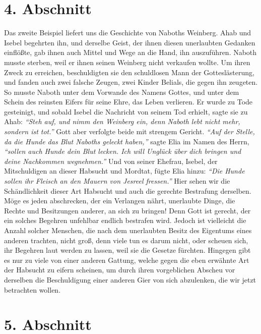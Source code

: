 \section{4. Abschnitt} \label{kap13_ab4}

Das zweite Beispiel liefert uns die Geschichte von
Naboths Weinberg.
Ahab und Isebel begehrten ihn, und
derselbe Geist, der ihnen diesen unerlaubten
Gedanken einflößte, gab ihnen auch Mittel und Wege an die Hand, ihn auszuführen.
Naboth musste sterben, weil er ihnen seinen Weinberg nicht verkaufen wollte. Um
ihren Zweck zu erreichen, beschuldigten sie den schuldlosen Mann der
Gotteslästerung, und fanden auch zwei falsche Zeugen, zwei Kinder
Belials, die
gegen ihn zeugeten. So musste Naboth unter dem Vorwande des Namens Gottes, und
unter dem Schein des reinsten Eifers für seine Ehre, das Leben verlieren. Er
wurde zu Tode gesteinigt, und sobald Isebel die Nachricht von seinem Tod
erhielt, sagte sie zu Ahab:
\textit{"`Steh auf, und nimm den Weinberg ein, denn Naboth
lebt nicht mehr, sondern ist tot."'} Gott aber verfolgte beide mit strengem
Gericht. \textit{"`Auf der Stelle, da die Hunde das Blut Naboths geleckt
haben,"'}
sagte Elia im Namen des Herrn, \textit{"`sollen auch Hunde
dein Blut lecken. Ich will
Unglück über dich bringen und deine Nachkommen wegnehmen."'} Und von seiner
Ehefrau, Isebel, der Mitschuldigen an dieser Habsucht und Mordtat, fügte Elia
hinzu:
\textit{"`Die Hunde sollen ihr Fleisch an den Mauern von Jesreel fressen."'}
Hier
sehen wir die Schändlichkeit dieser Art Habsucht und auch die gerechte
Bestrafung derselben. Möge es jeden abschrecken, der
ein Verlangen nährt,
unerlaubte Dinge, die Rechte und Besitzungen anderer, an sich zu bringen! Denn
Gott ist gerecht, der ein solches Begehren unfehlbar endlich bestrafen wird.
Jedoch ist vielleicht die Anzahl solcher Menschen, die nach dem unerlaubten
Besitz des Eigentums eines anderen trachten, nicht groß, denn viele tun es
darum nicht, oder scheuen sich, ihr Begehren laut werden zu lassen, weil sie die
Gesetze fürchten. Hingegen gibt es nur zu viele von einer anderen Gattung,
welche gegen die eben erwähnte Art der Habsucht zu eifern scheinen, um durch
ihren vorgeblichen Abscheu vor derselben die Beschuldigung einer anderen Gier
von sich abzulenken, die wir jetzt betrachten wollen.

\section{5. Abschnitt} \label{kap13_ab5}

